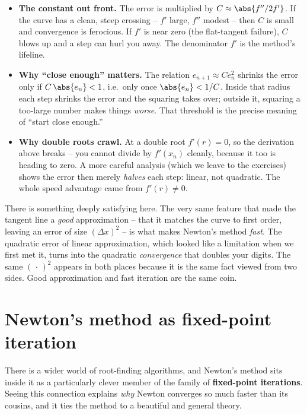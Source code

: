 \begin{itemize}
\item \textbf{The constant out front.} The error is multiplied by $C \approx
  \abs{f''/2f'}$. If the curve has a clean, steep crossing -- $f'$ large, $f''$
  modest -- then $C$ is small and convergence is ferocious. If $f'$ is near zero
  (the flat-tangent failure), $C$ blows up and a step can hurl you away. The
  denominator $f'$ is the method's lifeline.
\item \textbf{Why ``close enough'' matters.} The relation $e_{n+1} \approx C e_n^2$
  shrinks the error only if $C\,\abs{e_n} < 1$, i.e.\ only once $\abs{e_n} < 1/C$.
  Inside that radius each step shrinks the error and the squaring takes over; outside
  it, squaring a too-large number makes things \emph{worse}. That threshold is the
  precise meaning of ``start close enough.''
\item \textbf{Why double roots crawl.} At a double root $f'(r) = 0$, so the
  derivation above breaks -- you cannot divide by $f'(x_n)$ cleanly, because it too is
  heading to zero. A more careful analysis (which we leave to the exercises) shows
  the error then merely \emph{halves} each step: linear, not quadratic. The whole
  speed advantage came from $f'(r) \ne 0$.
\end{itemize}

\begin{aestheticbox}
There is something deeply satisfying here. The very same feature that made the
tangent line a \emph{good} approximation -- that it matches the curve to first order,
leaving an error of size $(\Delta x)^2$ -- is what makes Newton's method
\emph{fast}. The quadratic error of linear approximation, which looked like a
limitation when we first met it, turns into the quadratic \emph{convergence} that
doubles your digits. The same $(\,\cdot\,)^2$ appears in both places because it is
the same fact viewed from two sides. Good approximation and fast iteration are the
same coin.
\end{aestheticbox}

\section{Newton's method as fixed-point iteration}
\label{ch19:fixed-point}

There is a wider world of root-finding algorithms, and Newton's method sits inside
it as a particularly clever member of the family of \textbf{fixed-point
iterations}. Seeing this connection explains \emph{why} Newton converges so much
faster than its cousins, and it ties the method to a beautiful and general theory.

